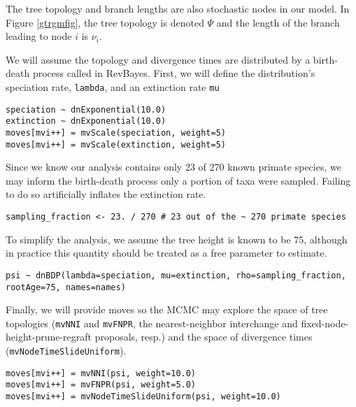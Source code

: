 The tree topology and branch lengths are also stochastic nodes in our model. 
In Figure \ref{gtrgmfig}, the tree topology is denoted $\Psi$ and the length of the branch leading to node $i$ is $\nu_i$.

We will assume the topology and divergence times are distributed by a birth-death process called  in RevBayes.
First, we will define the distribution's speciation rate, {\tt lambda}, and an extinction rate {\tt mu}

{\tt \begin{snugshade*}
\begin{lstlisting}
speciation ~ dnExponential(10.0)
extinction ~ dnExponential(10.0)
moves[mvi++] = mvScale(speciation, weight=5)
moves[mvi++] = mvScale(extinction, weight=5)
\end{lstlisting}
\end{snugshade*}}

Since we know our analysis contains only 23 of 270 known primate species, we may inform the birth-death process only a portion of taxa were sampled.
Failing to do so artificially inflates the extinction rate.

{\tt \begin{snugshade*}
\begin{lstlisting}
sampling_fraction <- 23. / 270 # 23 out of the ~ 270 primate species
\end{lstlisting}
\end{snugshade*}}

To simplify the analysis, we assume the tree height is known to be 75, although in practice this quantity should be treated as a free parameter to estimate.

{\tt \begin{snugshade*}
\begin{lstlisting}
psi ~ dnBDP(lambda=speciation, mu=extinction, rho=sampling_fraction, rootAge=75, names=names)
\end{lstlisting}
\end{snugshade*}}

Finally, we will provide moves so the MCMC may explore the space of tree topologies ({\tt mvNNI} and {\tt mvFNPR}, the nearest-neighbor interchange and fixed-node-height-prune-regraft proposals, resp.) and the space of divergence times ({\tt mvNodeTimeSlideUniform}).

{\tt \begin{snugshade*}
\begin{lstlisting}
moves[mvi++] = mvNNI(psi, weight=10.0)
moves[mvi++] = mvFNPR(psi, weight=5.0)
moves[mvi++] = mvNodeTimeSlideUniform(psi, weight=10.0)
\end{lstlisting}
\end{snugshade*}}

